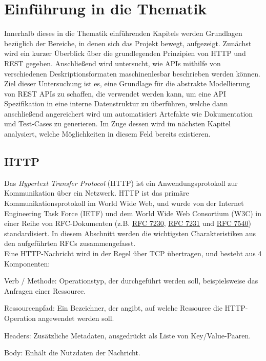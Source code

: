 
\section{Einführung in die Thematik}

Innerhalb dieses in die Thematik einführenden Kapitels werden Grundlagen bezüglich der Bereiche, in denen sich das Projekt bewegt, aufgezeigt. Zunächst wird ein kurzer Überblick über die grundlegenden Prinzipien von HTTP und REST gegeben. Anschließend wird untersucht, wie APIs mithilfe von verschiedenen Deskriptionsformaten maschinenlesbar beschrieben werden können. Ziel dieser Untersuchung ist es, eine Grundlage für die abstrakte Modellierung von REST APIs zu schaffen, die verwendet werden kann, um eine API Spezifikation in eine interne Datenstruktur zu überführen, welche dann anschließend angereichert wird um automatisiert Artefakte wie Dokumentation und Test-Cases zu generieren. Im Zuge dessen wird im nächsten Kapitel analysiert, welche Möglichkeiten in diesem Feld bereits existieren.

\subsection{HTTP}

Das \emph{Hypertext Transfer Protocol} (HTTP) ist ein Anwendungsprotokoll zur Kommunikation über ein Netzwerk. HTTP ist das primäre Kommunikationsprotokoll im World Wide Web, und wurde von der Internet Engineering Task Force (IETF) und dem World Wide Web Consortium (W3C) in einer Reihe von RFC-Dokumenten (z.B. \href{https://tools.ietf.org/html/rfc7230}{RFC 7230}, \href{https://tools.ietf.org/html/rfc7231}{RFC 7231} und \href{https://tools.ietf.org/html/rfc7540}{RFC 7540}) standardisiert. In diesem Abschnitt werden die wichtigsten Charakteristiken aus den aufgeführten RFCs zusammengefasst. \\

Eine HTTP-Nachricht wird in der Regel über TCP übertragen, und besteht aus 4 Komponenten:

\begin{description}
	\item Verb / Methode: Operationstyp, der durchgeführt werden soll, beispielsweise das Anfragen einer Ressource.
    \item Ressourcenpfad: Ein Bezeichner, der angibt, auf welche Ressource die HTTP-Operation angewendet werden soll.
    \item Headers: Zusätzliche Metadaten, ausgedrückt als Liste von Key/Value-Paaren.
    \item Body: Enhält die Nutzdaten der Nachricht.
\end{description}

